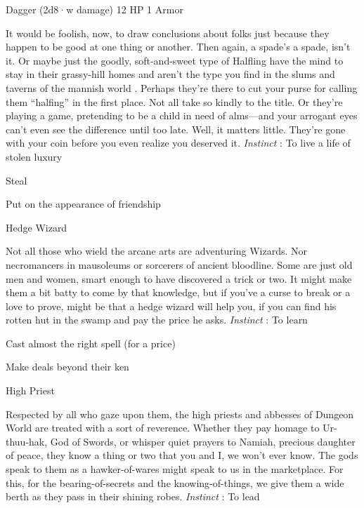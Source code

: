 Dagger (2d8·w damage)	12 HP	1 Armor

       


       
\startMonsterDescription
It would be foolish, now, to draw conclusions about folks just because they happen to be good at one thing or another. Then again, a spade’s a spade, isn’t it. Or maybe just the goodly, soft-and-sweet type of Halfling have the mind to stay in their grassy-hill homes and aren’t the type you find in the slums and taverns of the mannish world . Perhaps they’re there to cut your purse for calling them “halfing” in the first place. Not all take so kindly to the title. Or they’re playing a game, pretending to be a child in need of alms—and your arrogant eyes can’t even see the difference until too late. Well, it matters little. They’re gone with your coin before you even realize you deserved it. {\em Instinct} : To live a life of stolen luxury
\stopMonsterDescription
       
\startitemize[1,packed]
         
\item Steal

         
\item Put on the appearance of friendship

       
\stopitemize
       
\startMonsterName
Hedge Wizard	 
\stopMonsterName
       
\startMonsterDescription
Not all those who wield the arcane arts are adventuring Wizards. Nor necromancers in mausoleums or sorcerers of ancient bloodline. Some are just old men and women, smart enough to have discovered a trick or two. It might make them a bit batty to come by that knowledge, but if you’ve a curse to break or a love to prove, might be that a hedge wizard will help you, if you can find his rotten hut in the swamp and pay the price he asks. {\em Instinct} : To learn
\stopMonsterDescription
       
\startitemize[1,packed]
         
\item Cast almost the right spell (for a price)

         
\item Make deals beyond their ken

       
\stopitemize
       
\startMonsterName
High Priest	
\stopMonsterName
       
\startMonsterDescription
Respected by all who gaze upon them, the high priests and abbesses of Dungeon World are treated with a sort of reverence. Whether they pay homage to Ur-thuu-hak, God of Swords, or whisper quiet prayers to Namiah, precious daughter of peace, they know a thing or two that you and I, we won’t ever know. The gods speak to them as a hawker-of-wares might speak to us in the marketplace. For this, for the bearing-of-secrets and the knowing-of-things, we give them a wide berth as they pass in their shining robes. {\em Instinct} : To lead
\stopMonsterDescription
       
